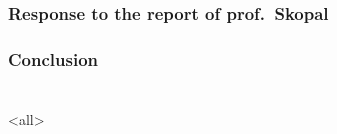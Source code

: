 \section{Response to the report of prof.\ Skopal}
\section{Conclusion}

\part{\bibname}
\frame{\vfill\partpage\vfill}

\section{\bibname}
\begin{frame}[allowframebreaks]{\bibname}
\printbibliography[heading=none]
\end{frame}

\mode
<all>
